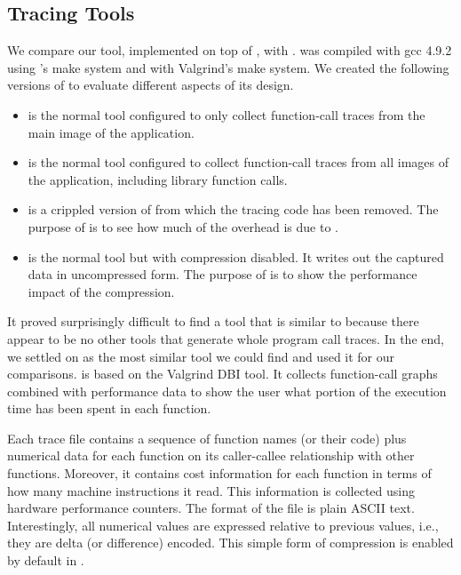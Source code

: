 \subsection{Tracing Tools}
\label{sec:tracing-tools}

We compare our \parlot tool, implemented on top of , with .
%
\parlot was compiled with gcc 4.9.2 using \pin 's make system and \callgrind with Valgrind's make system.
%
We created the following versions of \parlot to evaluate different aspects of its design.




\begin{itemize}
\item \textbf{\parlotm} is the normal \parlot tool configured to only collect function-call traces from the main image of the application.
\item \textbf{\parlota} is the normal \parlot tool configured to collect function-call traces from all images of the application, including library function calls.
\item \textbf{\pininit} is a crippled version of \parlot from which the tracing code has been removed.
%
The purpose of \pininit is to see how much of the overhead is due to \pin.
\item \textbf{\parlotnc} is the normal \parlot tool but with compression disabled.
%
It writes out the captured data in uncompressed form.
%
The purpose of \parlotnc is to show the performance impact of the compression.
\end{itemize}

It proved surprisingly difficult to find a tool that is similar to \parlot because there appear to be no other tools that generate whole program call traces.
%
In the end, we settled on \callgrind as the most similar tool we could find and used it for our comparisons.
%
\callgrind is based on the Valgrind DBI tool.
%
It collects function-call graphs combined with performance data to show the user what portion of the execution time has been spent in each function.


Each \callgrind trace file contains a sequence of function names (or their code) plus numerical data for each function on its caller-callee relationship with other functions.
%
Moreover, it contains cost information for each function in terms of how many machine instructions it read.
%
This information is collected using hardware performance counters.
%
The format of the file is plain ASCII text.
%
Interestingly, all numerical values are expressed relative to previous values, i.e., they are delta (or difference) encoded.
%
This simple form of compression is enabled by default in \callgrind.


